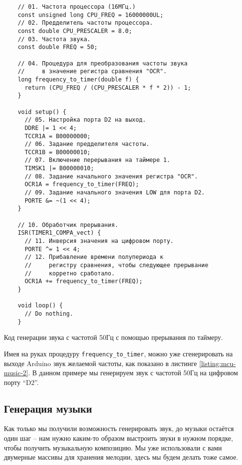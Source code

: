\documentclass[../sparc.tex]{subfiles}
\begin{document}
\begin{listing}[H]
  \begin{verbatim}
    // 01. Частота процессора (16МГц.)
    const unsigned long CPU_FREQ = 16000000UL;
    // 02. Предделитель частоты процессора.
    const double CPU_PRESCALER = 8.0;
    // 03. Частота звука.
    const double FREQ = 50;

    // 04. Процедура для преобразования частоты звука
    //     в значение регистра сравнения "OCR".
    long frequency_to_timer(double f) {
      return (CPU_FREQ / (CPU_PRESCALER * f * 2)) - 1;
    }

    void setup() {
      // 05. Настройка порта D2 на выход.
      DDRE |= 1 << 4;
      TCCR1A = B00000000;
      // 06. Задание предделителя частоты.
      TCCR1B = B00000010;
      // 07. Включение перерывания на таймере 1.
      TIMSK1 |= B00000010;
      // 08. Задание начального значения регистра "OCR".
      OCR1A = frequency_to_timer(FREQ);
      // 09. Задание начального значения LOW для порта D2.
      PORTE &= ~(1 << 4);
    }

    // 10. Обработчик прерывания.
    ISR(TIMER1_COMPA_vect) {
      // 11. Инверсия значения на цифровом порту.
      PORTE ^= 1 << 4;
      // 12. Прибавление времени полупериода к
      //     регистру сравнения, чтобы следующее прерывание
      //     корретно сработало.
      OCR1A += frequency_to_timer(FREQ);
    }

    void loop() {
      // Do nothing.
    }
  \end{verbatim}
  \caption{Код генерации звука с частотой 50Гц с помощью прерывания по таймеру.}
  \label{listing:mcu-music-2}
\end{listing}

Имея на руках процедуру \texttt{frequency_to_timer}, можно уже
сгенерировать на выходе Arduino звук желаемой частоты, как показано в листинге
\ref{listing:mcu-music-2}.  В данном примере мы генерируем звук с частотой 50Гц
на цифровом порту ``D2''.

\subsection{Генерация музыки}

Как только мы получили возможность генерировать звук, до музыки остаётся один
шаг -- нам нужно каким-то образом выстроить звуки в нужном порядке, чтобы
получить музыкальную композицию.  Мы уже использовали с вами двумерные массивы
для хранения мелодии, здесь мы будем делать тоже самое.
\end{document}
